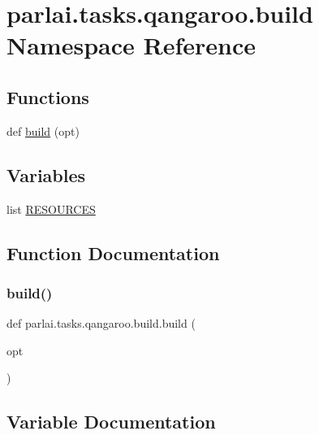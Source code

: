 \hypertarget{namespaceparlai_1_1tasks_1_1qangaroo_1_1build}{}\section{parlai.\+tasks.\+qangaroo.\+build Namespace Reference}
\label{namespaceparlai_1_1tasks_1_1qangaroo_1_1build}
\subsection*{Functions}
\begin{DoxyCompactItemize}
\item 
def \hyperlink{namespaceparlai_1_1tasks_1_1qangaroo_1_1build_a589f782a002790f9ff6a72dae2233368}{build} (opt)
\end{DoxyCompactItemize}
\subsection*{Variables}
\begin{DoxyCompactItemize}
\item 
list \hyperlink{namespaceparlai_1_1tasks_1_1qangaroo_1_1build_a51865ad8909ff2ba554ed45155bc5fe0}{R\+E\+S\+O\+U\+R\+C\+ES}
\end{DoxyCompactItemize}


\subsection{Function Documentation}
\mbox{\label{namespaceparlai_1_1tasks_1_1qangaroo_1_1build_a589f782a002790f9ff6a72dae2233368}} 
\subsubsection{\texorpdfstring{build()}{build()}}
{\footnotesize\ttfamily def parlai.\+tasks.\+qangaroo.\+build.\+build (\begin{DoxyParamCaption}\item[{}]{opt }\end{DoxyParamCaption})}



\subsection{Variable Documentation}
\mbox{\label{namespaceparlai_1_1tasks_1_1qangaroo_1_1build_a51865ad8909ff2ba554ed45155bc5fe0}} 
